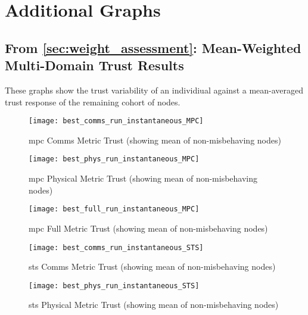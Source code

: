 %

\chapter{Additional Graphs}
\label{AppendixD}

\section{From \autoref{sec:weight_assessment}: Mean-Weighted Multi-Domain Trust Results}\label{sec:apx_mean_targeting_malicious}


These graphs show the trust variability of an individiual against a mean-averaged trust response of the remaining cohort of nodes.



\begin{figure}[h]
  \centering
  \texttt{[image: best\_comms\_run\_instantaneous\_MPC]}
  \caption{\gls{mpc} Comms Metric Trust (showing mean of non-misbehaving nodes)}
  \label{fig:comms_instantaneous_mpc}
\end{figure}

\begin{figure}[h]
  \centering
  \texttt{[image: best\_phys\_run\_instantaneous\_MPC]}
  \caption{\gls{mpc} Physical Metric Trust (showing mean of non-misbehaving nodes)}
  \label{fig:phys_instantaneous_mpc}
\end{figure}

\begin{figure}[h]
  \centering
  \texttt{[image: best\_full\_run\_instantaneous\_MPC]}
  \caption{\gls{mpc} Full Metric Trust (showing mean of non-misbehaving nodes)}
  \label{fig:full_instantaneous_mpc}
\end{figure}


\begin{figure}[h]
  \centering
  \texttt{[image: best\_comms\_run\_instantaneous\_STS]}
  \caption{\gls{sts} Comms Metric Trust (showing mean of non-misbehaving nodes)}
  \label{fig:comms_instantaneous_sts}
\end{figure}

\begin{figure}[h]
  \centering
  \texttt{[image: best\_phys\_run\_instantaneous\_STS]}
  \caption{\gls{sts} Physical Metric Trust (showing mean of non-misbehaving nodes)}
  \label{fig:phys_instantaneous_sts}
\end{figure}

